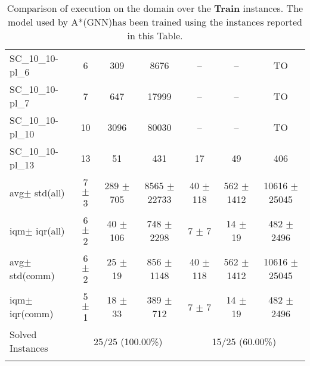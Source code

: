\documentclass{article}
\newcommand{\GNNres}{A*(GNN)}
\newcommand{\unsolvedColumn}{--}
\newcommand{\myTO}{TO}
\newcommand{\myAvg}{avg}
\newcommand{\myStd}{std}
\newcommand{\IQM}{iqm}
\newcommand{\IQR}{iqr}
\newcommand{\allInstances}{all}
\newcommand{\onlyInCommon}{comm}
\begin{document}
\begin{longtable}[!ht]{l|ccc|ccc}
SC\_10\_10-pl\_6 & 6 & 309 & 8676 & \unsolvedColumn & \unsolvedColumn & \myTO \\
SC\_10\_10-pl\_7 & 7 & 647 & 17999 & \unsolvedColumn & \unsolvedColumn & \myTO \\
SC\_10\_10-pl\_10 & 10 & 3096 & 80030 & \unsolvedColumn & \unsolvedColumn & \myTO \\
SC\_10\_10-pl\_13 & 13 & 51 & 431 & 17 & 49 & 406 \\
\hline
\myAvg  $\pm$ \myStd \hfill (\allInstances) & 7 $\pm$ 3 & 289 $\pm$ 705 & 8565 $\pm$ 22733 & 40 $\pm$ 118 & 562 $\pm$ 1412 & 10616 $\pm$ 25045 \\
\IQM $\pm$ \IQR \hfill (\allInstances) & 6 $\pm$ 2 & 40 $\pm$ 106 & 748 $\pm$ 2298 & 7 $\pm$ 7 & 14 $\pm$ 19 & 482 $\pm$ 2496 \\
\myAvg  $\pm$ \myStd \hfill (\onlyInCommon) & 6 $\pm$ 2 & 25 $\pm$ 19 & 856 $\pm$ 1148 & 40 $\pm$ 118 & 562 $\pm$ 1412 & 10616 $\pm$ 25045 \\
\IQM $\pm$ \IQR \hfill (\onlyInCommon) & 5 $\pm$ 1 & 18 $\pm$ 33 & 389 $\pm$ 712 & 7 $\pm$ 7 & 14 $\pm$ 19 & 482 $\pm$ 2496 \\
Solved Instances & \multicolumn{3}{c|}{25/25 (100.00\%)} & \multicolumn{3}{c}{15/25 (60.00\%)}
\\
\caption{Comparison of execution on the {} domain over the \textbf{Train} instances. The model used by \GNNres has been trained using the instances reported in this Table.}
\label{tab:{final_reports}_{}_comparison_train}
\end{longtable}
\end{document}
